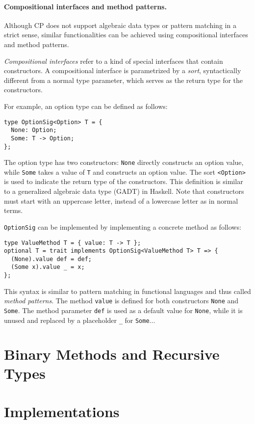 \paragraph{Compositional interfaces and method patterns.}
Although CP does not support algebraic data types or pattern matching in a
strict sense, similar functionalities can be achieved using compositional
interfaces and method patterns.

\emph{Compositional interfaces} refer to a kind of special interfaces that
contain constructors. A compositional interface is parametrized by a
\emph{sort}, syntactically different from a normal type parameter, which serves
as the return type for the constructors.

For example, an option type can be defined as follows:
\begin{lstlisting}
type OptionSig<Option> T = {
  None: Option;
  Some: T -> Option;
};
\end{lstlisting}
The option type has two constructors: \lstinline{None} directly constructs an
option value, while \lstinline{Some} takes a value of \lstinline{T} and
constructs an option value. The sort \lstinline{<Option>} is used to indicate
the return type of the constructors. This definition is similar to a generalized
algebraic data type (GADT) in Haskell. Note that constructors must start with an
uppercase letter, instead of a lowercase letter as in normal terms.

\lstinline{OptionSig} can be implemented by implementing a concrete method as
follows:
\begin{lstlisting}
type ValueMethod T = { value: T -> T };
optional T = trait implements OptionSig<ValueMethod T> T => {
  (None).value def = def;
  (Some x).value _ = x;
};
\end{lstlisting}
This syntax is similar to pattern matching in functional languages and thus
called \emph{method patterns}. The method \lstinline{value} is defined for both
constructors \lstinline{None} and \lstinline{Some}. The method parameter
\lstinline{def} is used as a default value for \lstinline{None}, while it is
unused and replaced by a placeholder \lstinline{_} for \lstinline{Some}...

\section{Binary Methods and Recursive Types}

\section{Implementations}


